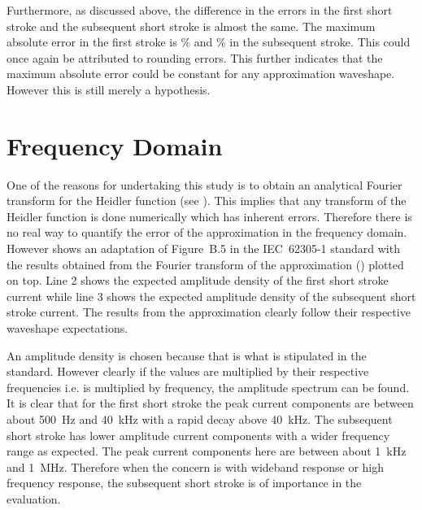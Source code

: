 Furthermore, as discussed above, the difference in the errors in the first short stroke and the subsequent short stroke is almost the same. The maximum absolute error in the first stroke is \unskip \% and \unskip \% in the subsequent stroke. This could once again be attributed to rounding errors. This further indicates that the maximum absolute error could be constant for any approximation waveshape. However this is still merely a hypothesis.


\section{Frequency Domain}
\label{sec:discussion_frequency_domain}
One of the reasons for undertaking this study is to obtain an analytical Fourier transform for the Heidler function (see ). This implies that any transform of the Heidler function is done numerically which has inherent errors. Therefore there is no real way to quantify the error of the approximation in the frequency domain. However  shows an adaptation of Figure~B.5 in the IEC~62305-1 standard with the results obtained from the Fourier transform of the approximation () plotted on top.
Line 2 shows the expected amplitude density of the first short stroke current while line 3 shows the expected amplitude density of the subsequent short stroke current. The results from the approximation clearly follow their respective waveshape expectations.

An amplitude density is chosen because that is what is stipulated in the standard. However clearly if the values are multiplied by their respective frequencies i.e.  is multiplied by frequency, the amplitude spectrum can be found. It is clear that for the first short stroke the peak current components are between about 500~Hz and 40~kHz with a rapid decay above 40~kHz. The subsequent short stroke has lower amplitude current components with a wider frequency range as expected. The peak current components here are between about 1~kHz and 1~MHz. Therefore when the concern is with wideband response or high frequency response, the subsequent short stroke is of importance in the evaluation.


